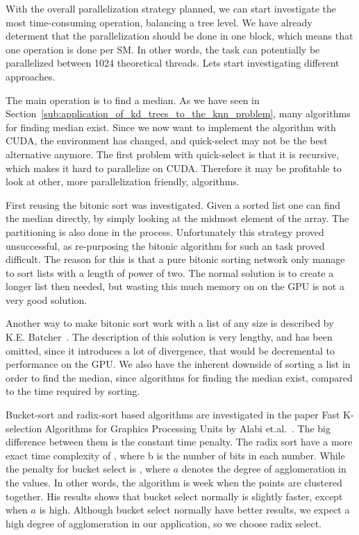 With the overall parallelization strategy planned, we can start investigate the most time-consuming operation, balancing a tree level. We have already determent that the parallelization should be done in one block, which means that one operation is done per SM\@. In other words, the task can potentially be parallelized between 1024 theoretical threads. Lets start investigating different approaches.

The main operation is to find a median. As we have seen in Section~\ref{sub:application_of_kd_trees_to_the_knn_problem}, many algorithms for finding median exist. Since we now want to implement the algorithm with CUDA, the environment has changed, and quick-select may not be the best alternative anymore. The first problem with quick-select is that it is recursive, which makes it hard to parallelize on CUDA\@. Therefore it may be profitable to look at other, more parallelization friendly, algorithms.

First reusing the bitonic sort was investigated. Given a sorted list one can find the median directly, by simply looking at the midmost element of the array. The partitioning is also done in the process. Unfortunately this strategy proved unsuccessful, as re-purposing the bitonic algorithm for such an task proved difficult. The reason for this is that a pure bitonic sorting network only manage to sort lists with a length of power of two. The normal solution is to create a longer list then needed, but wasting this much memory on on the GPU is not a very good solution. 

Another way to make bitonic sort work with a list of any size is described by K.E. Batcher~\cite{Batcher:1968}. The description of this solution is very lengthy, and has been omitted, since it introduces a lot of divergence, that would be decremental to performance on the GPU\@. We also have the inherent downside of sorting a list in order to find the median, since  algorithms for finding the median exist, compared to the  time required by sorting.

Bucket-sort and radix-sort based algorithms are investigated in the paper Fast K-selection Algorithms for Graphics Processing Units by Alabi et.al\@.~\citep{Alabi:2012}. The big difference between them is the constant time penalty. The radix sort have a more exact time complexity of , where b is the number of bits in each number. While the penalty for bucket select is , where $a$ denotes the degree of agglomeration in the values. In other words, the algorithm is week when the points are clustered together. His results shows that bucket select normally is slightly faster, except when $a$ is high. Although bucket select normally have better results, we expect a high degree of agglomeration in our application, so we choose radix select.

